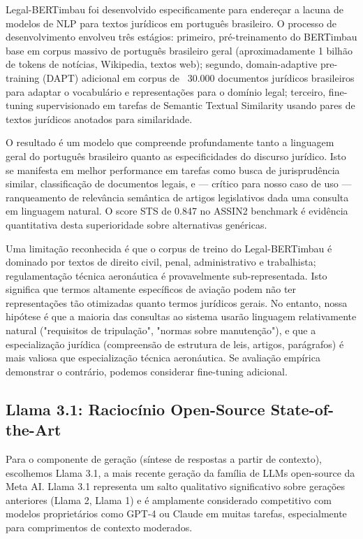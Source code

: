 \documentclass[12pt,a4paper]{article}
\begin{document}
Legal-BERTimbau foi desenvolvido especificamente para endereçar a lacuna de modelos de NLP para textos jurídicos em português brasileiro. O processo de desenvolvimento envolveu três estágios: primeiro, pré-treinamento do BERTimbau base em corpus massivo de português brasileiro geral (aproximadamente 1 bilhão de tokens de notícias, Wikipedia, textos web); segundo, domain-adaptive pre-training (DAPT) adicional em corpus de ~30.000 documentos jurídicos brasileiros para adaptar o vocabulário e representações para o domínio legal; terceiro, fine-tuning supervisionado em tarefas de Semantic Textual Similarity usando pares de textos jurídicos anotados para similaridade.

O resultado é um modelo que compreende profundamente tanto a linguagem geral do português brasileiro quanto as especificidades do discurso jurídico. Isto se manifesta em melhor performance em tarefas como busca de jurisprudência similar, classificação de documentos legais, e — crítico para nosso caso de uso — ranqueamento de relevância semântica de artigos legislativos dada uma consulta em linguagem natural. O score STS de 0.847 no ASSIN2 benchmark é evidência quantitativa desta superioridade sobre alternativas genéricas.

Uma limitação reconhecida é que o corpus de treino do Legal-BERTimbau é dominado por textos de direito civil, penal, administrativo e trabalhista; regulamentação técnica aeronáutica é provavelmente sub-representada. Isto significa que termos altamente específicos de aviação podem não ter representações tão otimizadas quanto termos jurídicos gerais. No entanto, nossa hipótese é que a maioria das consultas ao sistema usarão linguagem relativamente natural ("requisitos de tripulação", "normas sobre manutenção"), e que a especialização jurídica (compreensão de estrutura de leis, artigos, parágrafos) é mais valiosa que especialização técnica aeronáutica. Se avaliação empírica demonstrar o contrário, podemos considerar fine-tuning adicional.

\subsection{Llama 3.1: Raciocínio Open-Source State-of-the-Art}

Para o componente de geração (síntese de respostas a partir de contexto), escolhemos Llama 3.1, a mais recente geração da família de LLMs open-source da Meta AI. Llama 3.1 representa um salto qualitativo significativo sobre gerações anteriores (Llama 2, Llama 1) e é amplamente considerado competitivo com modelos proprietários como GPT-4 ou Claude em muitas tarefas, especialmente para comprimentos de contexto moderados.
\end{document}
